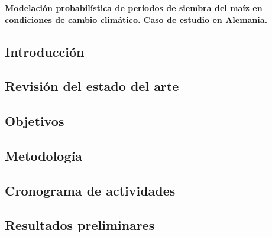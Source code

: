 \documentclass[12pt,oneside,article]{memoir}
\begin{document}
\thispagestyle{firstpagestyle}
\textbf{Modelación probabilística de periodos de siembra del maíz en condiciones de cambio climático. Caso de estudio en Alemania.}

\subsection*{Introducción}


%

\subsection{Revisión del estado del arte}


\subsection{Objetivos}


\subsection{Metodología}


\newpage
\subsection{Cronograma de actividades}


\subsection{Resultados preliminares}

\end{document}
